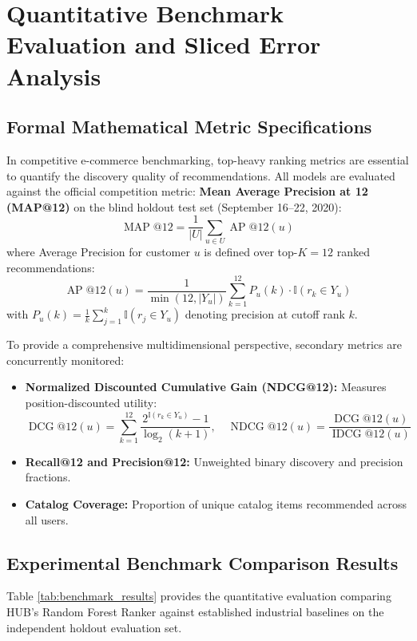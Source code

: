 \section{Quantitative Benchmark Evaluation and Sliced Error Analysis}

\subsection{Formal Mathematical Metric Specifications}
In competitive e-commerce benchmarking, top-heavy ranking metrics are essential to quantify the discovery quality of recommendations. All models are evaluated against the official competition metric: \textbf{Mean Average Precision at 12 (MAP@12)} on the blind holdout test set (September 16--22, 2020):
\begin{equation}
    \operatorname{MAP}@12 = \frac{1}{|U|} \sum_{u \in U} \operatorname{AP}@12(u)
\end{equation}
where Average Precision for customer $u$ is defined over top-$K=12$ ranked recommendations:
\begin{equation}
    \operatorname{AP}@12(u) = \frac{1}{\min(12, |Y_u|)} \sum_{k=1}^{12} P_u(k) \cdot \mathbb{I}(r_k \in Y_u)
\end{equation}
with $P_u(k) = \frac{1}{k} \sum_{j=1}^{k} \mathbb{I}(r_j \in Y_u)$ denoting precision at cutoff rank $k$.

To provide a comprehensive multidimensional perspective, secondary metrics are concurrently monitored:
\begin{itemize}
    \item \textbf{Normalized Discounted Cumulative Gain (NDCG@12):} Measures position-discounted utility:
    \begin{equation}
        \operatorname{DCG}@12(u) = \sum_{k=1}^{12} \frac{2^{\mathbb{I}(r_k \in Y_u)} - 1}{\log_2(k + 1)}, \quad \operatorname{NDCG}@12(u) = \frac{\operatorname{DCG}@12(u)}{\operatorname{IDCG}@12(u)}
    \end{equation}
    \item \textbf{Recall@12 and Precision@12:} Unweighted binary discovery and precision fractions.
    \item \textbf{Catalog Coverage:} Proportion of unique catalog items recommended across all users.
\end{itemize}

\subsection{Experimental Benchmark Comparison Results}
Table \ref{tab:benchmark_results} provides the quantitative evaluation comparing HUB's Random Forest Ranker against established industrial baselines on the independent holdout evaluation set.


